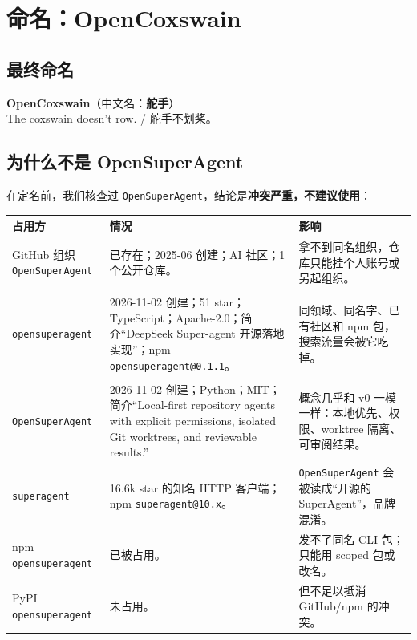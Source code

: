 \documentclass[UTF8,11pt,a4paper,fontset=windows]{ctexart}
\let\ocsection\section
\renewcommand{\section}{\Needspace{8\baselineskip}\ocsection}
\let\ocsubsection\subsection
\renewcommand{\subsection}{\Needspace{5\baselineskip}\ocsubsection}
\newcommand{\code}[1]{\texttt{#1}}
\begin{document}
\section{命名：OpenCoxswain}
\label{sec:naming}

\subsection{最终命名}

\begin{keybox}[产品名]
\textbf{OpenCoxswain}（中文名：\textbf{舵手}）\\
The coxswain doesn't row. / 舵手不划桨。
\end{keybox}

\subsection{为什么不是 OpenSuperAgent}

在定名前，我们核查过 \code{OpenSuperAgent}，结论是\textbf{冲突严重，不建议使用}：

\noindent\begin{minipage}{\linewidth}
\centering
{}
\small
\begin{tabularx}{\linewidth}{@{}p{4.0cm} p{4.2cm} X@{}}
\toprule
\textbf{占用方} & \textbf{情况} & \textbf{影响} \\
\midrule
GitHub 组织 \code{OpenSuperAgent} & 已存在；2025-06 创建；AI 社区；1 个公开仓库。 & 拿不到同名组织，仓库只能挂个人账号或另起组织。 \\
\makecell[l]{\code{thefullgc/}\\\code{opensuperagent}} & 2026-11-02 创建；51 star；TypeScript；Apache-2.0；简介“DeepSeek Super-agent 开源落地实现”；npm \code{opensuperagent@0.1.1}。 & 同领域、同名字、已有社区和 npm 包，搜索流量会被它吃掉。 \\
\makecell[l]{\code{xinyuchen-pku/}\\\code{OpenSuperAgent}} & 2026-11-02 创建；Python；MIT；简介“Local-first repository agents with explicit permissions, isolated Git worktrees, and reviewable results.” & 概念几乎和 v0 一模一样：本地优先、权限、worktree 隔离、可审阅结果。 \\
\code{superagent} & 16.6k star 的知名 HTTP 客户端；npm \code{superagent@10.x}。 & \code{OpenSuperAgent} 会被读成“开源的 SuperAgent”，品牌混淆。 \\
npm \code{opensuperagent} & 已被占用。 & 发不了同名 CLI 包；只能用 scoped 包或改名。 \\
PyPI \code{opensuperagent} & 未占用。 & 但不足以抵消 GitHub/npm 的冲突。 \\
\bottomrule
\end{tabularx}
\end{minipage}
\end{document}
